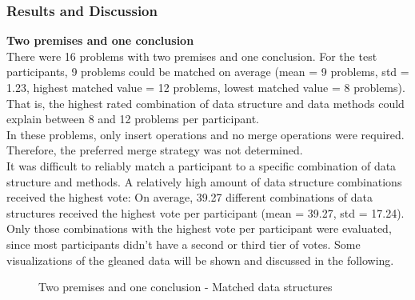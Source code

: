 \documentclass[hidelinks]{scrartcl}
\begin{document}
\subsubsection{Results and Discussion}
\textbf{Two premises and one conclusion} \\
There were 16 problems with two premises and one conclusion. For the test participants, 9 problems could be matched on average (mean = 9 problems, std = 1.23, highest matched value = 12 problems, lowest matched value = 8 problems). That is, the highest rated combination of data structure and data methods could explain between 8 and 12 problems per participant. \\
In these problems, only insert operations and no merge operations were required. Therefore, the preferred merge strategy was not determined. \\
It was difficult to reliably match a participant to a specific combination of data structure and methods. A relatively high amount of data structure combinations received the highest vote: On average, 39.27 different combinations of data structures received the highest vote per participant (mean = 39.27, std = 17.24). Only those combinations with the highest vote per participant were evaluated, since most participants didn't have a second or third tier of votes. Some visualizations of the gleaned data will be shown and discussed in the following.

\begin{figure}[H]
	\caption{Two premises and one conclusion - Matched data structures}
	\label{img:exp2_3prem_data_structures}
	\begin{center}
	\end{center}
\end{figure}
\end{document}
